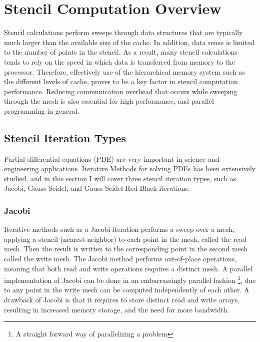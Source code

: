 \section{Stencil Computation Overview}
Stencil calculations perform sweeps through data structures that are typically much larger than the available size of the cache. In addition, data reuse is limited to the number of points in the stencil. As a result, many stencil calculations tends to rely on the speed in which data is transferred from memory to the processor. Therefore, effectively use of the hierarchical memory system such as the different levels of cache, proves to be a key factor in stencil computation performance. Reducing communication overhead that occurs while sweeping through the mesh is also essential for high performance, and parallel programming in general.

\subsection{Stencil Iteration Types}
\label{subsec:stencil_iteration_types}
Partial differential equations (PDE) are very important in science and engineering applications. Iterative Methods for solving PDEs has been extensively studied, and in this section I will cover three stencil iteration types, such as Jacobi, Gauss-Seidel, and Gauss-Seidel Red-Black iterations.

\subsubsection{Jacobi}
Iterative methods such as a Jacobi iteration performs a sweep over a mesh, applying a stencil (nearest-neighbor) to each point in the mesh, called the read mesh. Then the result is written to the corresponding point in the second mesh called the write mesh. The Jacobi method performs out-of-place operations, meaning that both read and write operations requires a distinct mesh. A parallel implementation of Jacobi can be done in an embarrassingly parallel fashion \footnote{A straight forward way of parallelizing a problem}, due to any point in the write mesh can be computed independently of each other. A drawback of Jacobi is that it requires to store distinct read and write arrays, resulting in increased memory storage, and the need for more bandwidth.


